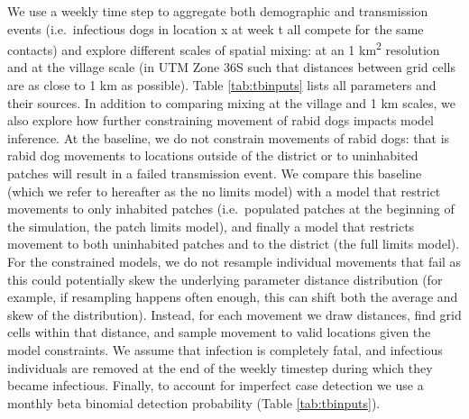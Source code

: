 \documentclass[
]{book}
\begin{document}
We use a weekly time step to aggregate both demographic and transmission events (i.e.~infectious dogs in location x at week t all compete for the same contacts) and explore different scales of spatial mixing: at an 1 km\textsuperscript{2} resolution and at the village scale (in UTM Zone 36S such that distances between grid cells are as close to 1 km as possible). Table \ref{tab:tbinputs} lists all parameters and their sources. In addition to comparing mixing at the village and 1 km scales, we also explore how further constraining movement of rabid dogs impacts model inference. At the baseline, we do not constrain movements of rabid dogs: that is rabid dog movements to locations outside of the district or to uninhabited patches will result in a failed transmission event. We compare this baseline (which we refer to hereafter as the no limits model) with a model that restrict movements to only inhabited patches (i.e.~populated patches at the beginning of the simulation, the patch limits model), and finally a model that restricts movement to both uninhabited patches and to the district (the full limits model). For the constrained models, we do not resample individual movements that fail as this could potentially skew the underlying parameter distance distribution (for example, if resampling happens often enough, this can shift both the average and skew of the distribution). Instead, for each movement we draw distances, find grid cells within that distance, and sample movement to valid locations given the model constraints. We assume that infection is completely fatal, and infectious individuals are removed at the end of the weekly timestep during which they became infectious. Finally, to account for imperfect case detection we use a monthly beta binomial detection probability (Table \ref{tab:tbinputs}).
\end{document}
